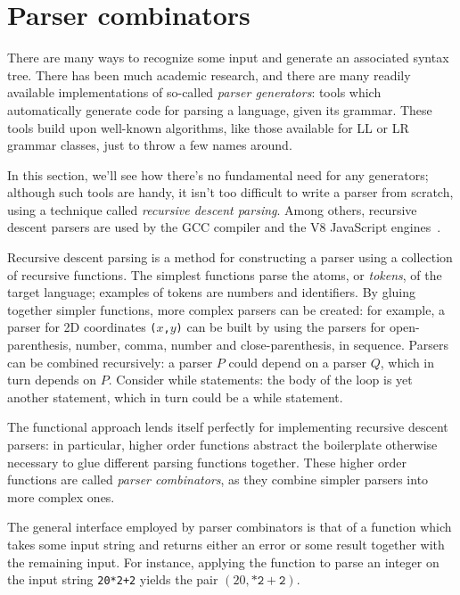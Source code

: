 \documentclass[UdineBachThesis,american,11pt]{PhdThesis}
\begin{document}
  \section{Parser combinators}
  \label{section:parser-combinators}

  There are many ways to recognize some input and generate an associated syntax
  tree. There has been much academic research, and there are many readily
  available implementations of so-called \emph{parser generators}: tools which
  automatically generate code for parsing a language, given its grammar. These
  tools build upon well-known algorithms, like those available for LL or
  LR~\cite{lr} grammar classes, just to throw a few names around.

  In this section, we'll see how there's no fundamental need for any generators;
  although such tools are handy, it isn't too difficult to write a parser from
  scratch, using a technique called \emph{recursive descent parsing}. Among
  others, recursive descent parsers are used by the GCC compiler and the V8
  JavaScript engines~\cite{recursive-descent-parsing}.

  Recursive descent parsing is a method for constructing a parser using a
  collection of recursive functions. The simplest functions parse the atoms, or
  \emph{tokens}, of the target language; examples of tokens are numbers and
  identifiers. By gluing together simpler functions, more complex parsers can be
  created: for example, a parser for 2D coordinates \mbox{\texttt{($x$,$y$)}}
  can be built by using the parsers for open-parenthesis, number, comma, number
  and close-parenthesis, in sequence. Parsers can be combined recursively: a
  parser $P$ could depend on a parser $Q$, which in turn depends on $P$\@.
  Consider while statements: the body of the loop is yet another statement,
  which in turn could be a while statement.

  The functional approach lends itself perfectly for implementing recursive
  descent parsers: in particular, higher order functions abstract the
  boilerplate otherwise necessary to glue different parsing functions together.
  These higher order functions are called \emph{parser combinators}, as they
  combine simpler parsers into more complex ones.

  The general interface employed by parser combinators is that of a function
  which takes some input string and returns either an error or some result
  together with the remaining input. For instance, applying the function to
  parse an integer on the input string \mbox{\texttt{20*2+2}} yields the pair
  \mbox{$\left(20, \mathtt{*2+2}\right)$}.
\end{document}
